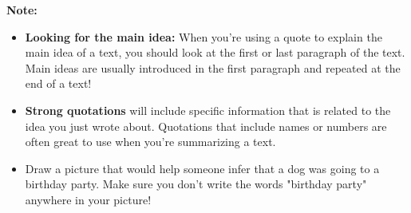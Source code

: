 \documentclass[12pt]{article}
\begin{document}
\vspace{1em}
\begin{tcolorbox}[colframe=black!40, colback=gray!5, 
coltitle=black, colbacktitle=black!20, fonttitle=\bfseries\Large, 
title=Additional Notes, halign title=center, left=5pt, right=5pt, top=5pt, bottom=15pt]
\textbf{Note:}
\begin{itemize}
    \item \textbf{Looking for the main idea:} When you're using a quote to explain the main idea of a text, you should look at the first or last paragraph of the text. Main ideas are usually introduced in the first paragraph and repeated at the end of a text!
    \item \textbf{Strong quotations} will include specific information that is related to the idea you just wrote about. Quotations that include names or numbers are often great to use when you're summarizing a text. 



\end{itemize}
\end{tcolorbox}

\vspace{1em}

\begin{tcolorbox}[colframe=black!60, colback=white, 
coltitle=black, colbacktitle=black!15, fonttitle=\bfseries\Large, 
title=Exit Ticket, halign title=center, left=10pt, right=10pt, top=10pt, bottom=15pt]

\begin{itemize}
    \item Draw a picture that would help someone infer that a dog was going to a birthday party. Make sure you don't write the words "birthday party" anywhere in your picture!
\vspace{32em}

\end{itemize}
\end{tcolorbox}
\end{document}
